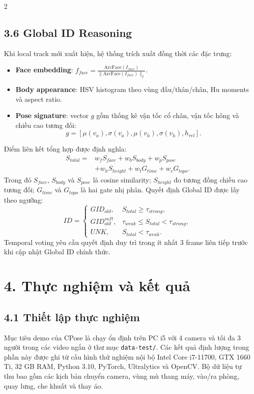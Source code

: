 \documentclass[a4paper, twoside, 10pt]{article}
\begin{document}
\begin{multicols}{2}
\subsection*{3.6 Global ID Reasoning}
Khi local track mới xuất hiện, hệ thống trích xuất đồng thời các đặc trưng:
\begin{itemize}
\item \textbf{Face embedding}: $f_{face}= \frac{\text{ArcFace}(I_{face})}{\|\text{ArcFace}(I_{face})\|_2}$.
\item \textbf{Body appearance}: HSV histogram theo vùng đầu/thân/chân, Hu moments và aspect ratio.
\item \textbf{Pose signature}: vector $g$ gồm thống kê vận tốc cổ chân, vận tốc hông và chiều cao tương đối:
\begin{equation}
g=[\mu(v_a), \sigma(v_a), \mu(v_h), \sigma(v_h), h_{rel}].
\end{equation}
\end{itemize}
Điểm liên kết tổng hợp được định nghĩa:
\begin{equation}
\begin{aligned}
S_{total}={}& w_f S_{face} + w_b S_{body} + w_p S_{pose}\\
&+ w_h S_{height} + w_t G_{time} + w_c G_{topo}.
\end{aligned}
\end{equation}
Trong đó $S_{face}$, $S_{body}$ và $S_{pose}$ là cosine similarity; $S_{height}$ đo tương đồng chiều cao tương đối; $G_{time}$ và $G_{topo}$ là hai gate nhị phân. Quyết định Global ID được lấy theo ngưỡng:
\begin{equation}
ID =
\begin{cases}
GID_{old}, & S_{total} \geq \tau_{strong},\\
GID_{old}^{soft}, & \tau_{weak}\leq S_{total}<\tau_{strong},\\
UNK, & S_{total}<\tau_{weak}.
\end{cases}
\end{equation}
Temporal voting yêu cầu quyết định duy trì trong ít nhất 3 frame liên tiếp trước khi cập nhật Global ID chính thức.

\section*{4. Thực nghiệm và kết quả}
\subsection*{4.1 Thiết lập thực nghiệm}
Mục tiêu demo của CPose là chạy ổn định trên PC i5 với 4 camera và tối đa 3 người trong các video ngắn ở thư mục \texttt{data-test/}. Các kết quả định lượng trong phần này được ghi từ cấu hình thử nghiệm nội bộ Intel Core i7-11700, GTX 1660 Ti, 32 GB RAM, Python 3.10, PyTorch, Ultralytics và OpenCV. Bộ dữ liệu tự thu bao gồm các kịch bản chuyển camera, vùng mù thang máy, vào/ra phòng, quay lưng, che khuất và thay áo.


\end{multicols}
\end{document}
